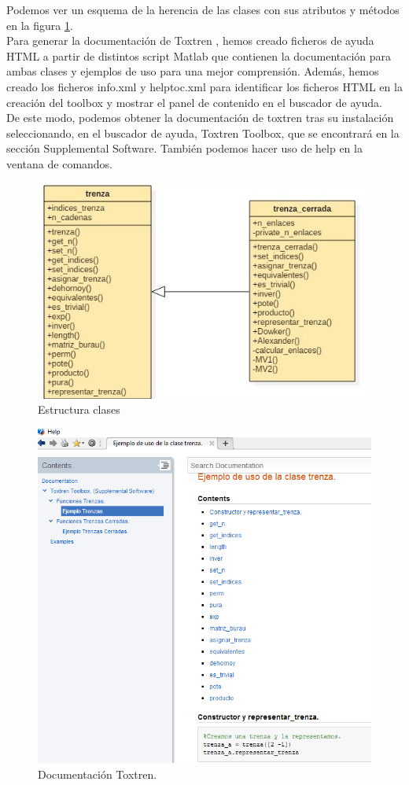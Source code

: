 Podemos ver un esquema de la herencia de las clases con sus atributos y métodos en la figura \ref{escl}.\\

Para generar la documentación de Toxtren \cite{15}, hemos creado ficheros de ayuda HTML a partir de distintos script Matlab que contienen la documentación para ambas clases y ejemplos de uso para una mejor comprensión. Además, hemos creado los ficheros info.xml y helptoc.xml para identificar los ficheros HTML en la creación del toolbox y mostrar el panel de contenido en el buscador de ayuda.\\

De este modo, podemos obtener la documentación de toxtren tras su instalación seleccionando, en el buscador de ayuda, Toxtren Toolbox, que se encontrará en la sección Supplemental Software. También podemos hacer uso de help en la ventana de comandos. 

\begin{figure}[h!]
	\centering
	\includegraphics[width=11cm]{img/Main.jpg}
	\caption{Estructura clases}
	\label{escl} 
\end{figure}
 
\begin{figure}[h!]
	\centering
	\includegraphics[width=13cm]{img/docu.png}
	\caption{Documentación Toxtren.}
	\label{docu1} 
\end{figure}